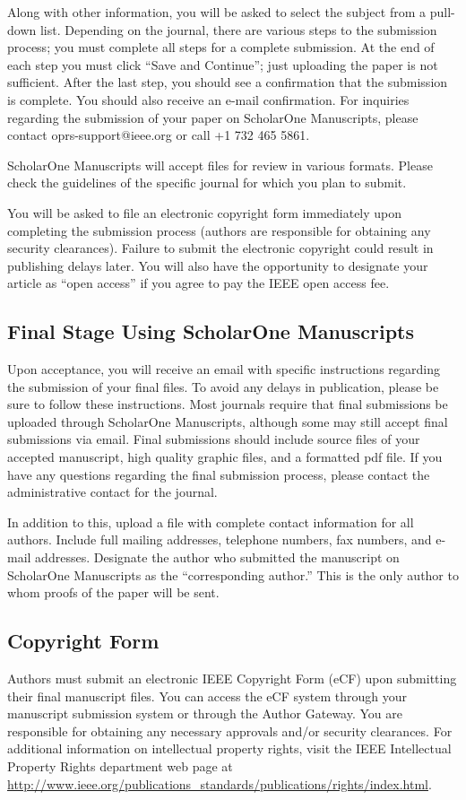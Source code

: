 \documentclass{IEEEtran}
\begin{document}
Along with other information, you will be asked to select the subject from a 
pull-down list. Depending on the journal, there are various steps to the 
submission process; you must complete all steps for a complete submission. 
At the end of each step you must click ``Save and Continue''; just uploading 
the paper is not sufficient. After the last step, you should see a 
confirmation that the submission is complete. You should also receive an 
e-mail confirmation. For inquiries regarding the submission of your paper on 
ScholarOne Manuscripts, please contact oprs-support@ieee.org or call +1 732 
465 5861.

ScholarOne Manuscripts will accept files for review in various formats. 
Please check the guidelines of the specific journal for which you plan to 
submit.

You will be asked to file an electronic copyright form immediately upon 
completing the submission process (authors are responsible for obtaining any 
security clearances). Failure to submit the electronic copyright could 
result in publishing delays later. You will also have the opportunity to 
designate your article as ``open access'' if you agree to pay the IEEE open 
access fee. 

\subsection{Final Stage Using ScholarOne Manuscripts}
Upon acceptance, you will receive an email with specific instructions 
regarding the submission of your final files. To avoid any delays in 
publication, please be sure to follow these instructions. Most journals 
require that final submissions be uploaded through ScholarOne Manuscripts, 
although some may still accept final submissions via email. Final 
submissions should include source files of your accepted manuscript, high 
quality graphic files, and a formatted pdf file. If you have any questions 
regarding the final submission process, please contact the administrative 
contact for the journal. 

In addition to this, upload a file with complete contact information for all 
authors. Include full mailing addresses, telephone numbers, fax numbers, and 
e-mail addresses. Designate the author who submitted the manuscript on 
ScholarOne Manuscripts as the ``corresponding author.'' This is the only 
author to whom proofs of the paper will be sent. 

\subsection{Copyright Form}
Authors must submit an electronic IEEE Copyright Form (eCF) upon submitting 
their final manuscript files. You can access the eCF system through your 
manuscript submission system or through the Author Gateway. You are 
responsible for obtaining any necessary approvals and/or security 
clearances. For additional information on intellectual property rights, 
visit the IEEE Intellectual Property Rights department web page at 
\underline{http://www.ieee.org/publications\_standards/publications/rights/}\discretionary{}{}{}\underline{index.html}. 
\end{document}

